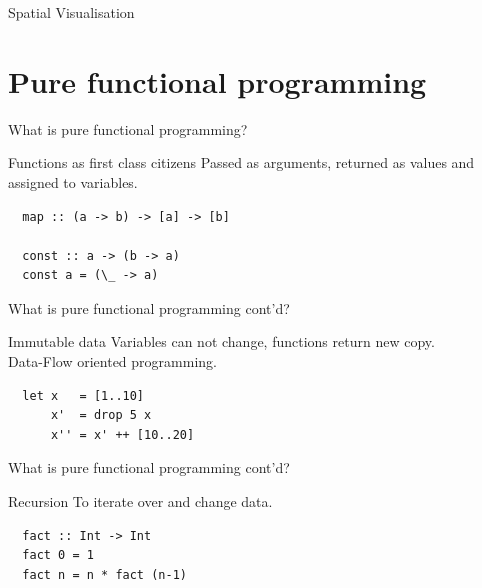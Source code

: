 \documentclass{beamer} %
\begin{document}
\begin{frame}{Spatial Visualisation}
\end{frame}

\section{Pure functional programming}
\begin{frame}[fragile]{What is pure functional programming?}
  \begin{block}{Functions as first class citizens}
  	Passed as arguments, returned as values and assigned to variables.
  \end{block}
  
  \begin{block}{}
  \begin{verbatim}
  map :: (a -> b) -> [a] -> [b]
	
  const :: a -> (b -> a)
  const a = (\_ -> a)
  \end{verbatim}
  \end{block}
\end{frame}
 
\begin{frame}[fragile]{What is pure functional programming cont'd?}
  \begin{block}{Immutable data}
 	Variables can not change, functions return new copy. \\ Data-Flow oriented programming.
  \end{block}
  
  \begin{block}{}
  \begin{verbatim}
  let x   = [1..10]
      x'  = drop 5 x
      x'' = x' ++ [10..20] 
  \end{verbatim}
  \end{block}
\end{frame}
 
\begin{frame}[fragile]{What is pure functional programming cont'd?}
  \begin{block}{Recursion}
 	To iterate over and change data. 
  \end{block}
  
  \begin{block}{}
  \begin{verbatim}
  fact :: Int -> Int
  fact 0 = 1
  fact n = n * fact (n-1)
  \end{verbatim}
  \end{block}
\end{frame}
 
\end{document}
